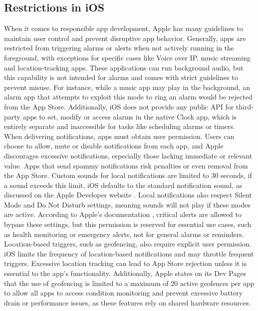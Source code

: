 \subsection{Restrictions in iOS}
When it comes to responsible app development, Apple has many guidelines to maintain user control and prevent disruptive app behavior. 
Generally, apps are restricted from triggering alarms or alerts when not actively running in the foreground, with exceptions for specific cases like Voice over IP, music streaming and location-tracking apps. 
These applications can run background audio, but this capability is not intended for alarms and comes with strict guidelines to prevent misuse. 
For instance, while a music app may play in the background, an alarm app that attempts to exploit this mode to ring an alarm would be rejected from the App Store.
Additionally, iOS does not provide any public API for third-party apps to set, modify or access alarms in the native Clock app, which is entirely separate and inaccessible for tasks like scheduling alarms or timers. 
When delivering notifications, apps must obtain user permission. 
Users can choose to allow, mute or disable notifications from each app, and Apple discourages excessive notifications, especially those lacking immediate or relevant value. 
Apps that send spammy notifications risk penalties or even removal from the App Store. 
Custom sounds for local notifications are limited to 30 seconds, if a sound exceeds this limit, iOS defaults to the standard notification sound, as discussed on the Apple Developer website \cite{apple_sound_guidelines}.
Local notifications also respect Silent Mode and Do Not Disturb settings, meaning sounds will not play if these modes are active. 
According to Apple's documentation \cite{apple_critical_alerts}, critical alerts are allowed to bypass these settings, but this permission is reserved for essential use cases, such as health monitoring or emergency alerts, not for general alarms or reminders. 
Location-based triggers, such as geofencing, also require explicit user permission. 
iOS \cite{apple_geofencing_limits} limits the frequency of location-based notifications and may throttle frequent triggers. 
Excessive location tracking can lead to App Store rejection unless it is essential to the app's functionality. 
Additionally, Apple states on its Dev Pages \cite{apple_geofencing} that the use of geofencing is limited to a maximum of 20 active geofences per app to allow all apps to access condition monitoring and prevent excessive battery drain or performance issues, as these features rely on shared hardware resources.

